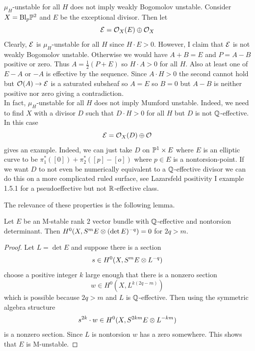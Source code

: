 \documentclass[main.tex]{subfiles}
\begin{document}
\begin{example}
$\mu_H$-unstable for all $H$ does not imply weakly Bogomolov unstable. Consider $X = \Bl_p \P^2$ and $E$ be the exceptional divisor. Then let
\[ \E = \struct{X}(E) \oplus \struct{X} \]
Clearly, $\E$ is $\mu_H$-unstable for all $H$ since $H \cdot E > 0$. However, I claim that $\E$ is not weakly Bogomolov unstable. Otherwise we would have $A + B = E$ and $P = A - B$ positive or zero. Thus $A = \tfrac{1}{2}(P + E)$ so $H \cdot A > 0$ for all $H$. Also at least one of $E - A$ or $-A$ is effective by the sequence. Since $A \cdot H > 0$ the second cannot hold but $\struct{}(A) \to \E$ is a saturated subsheaf so $A = E$ so $B = 0$ but $A - B$ is neither positive nor zero giving a contradiction.
\bigskip\\
In fact, $\mu_H$-unstable for all $H$ does not imply Mumford unstable. Indeed, we need to find $X$ with a divisor $D$ such that $D \cdot H > 0$ for all $H$ but $D$ is not $\Q$-effective. In this case
\[ \E = \struct{X}(D) \oplus \struct{} \]
gives an example. Indeed, we can just take $D$ on $\P^1 \times E$ where $E$ is an elliptic curve to be $\pi_1^* ([0]) + \pi_2^* ([p] - [o])$ where $p \in E$ is a nontorsion-point. If we want $D$ to not even be numerically equivalent to a $\Q$-effective divisor we can do this on a more complicated ruled surface, see Lazarsfeld positivity I example 1.5.1 for a pseudoeffective but not $\R$-effective class.
\end{example}


The relevance of these properties is the following lemma.

\begin{lemma}
Let $E$ be an M-stable rank $2$ vector bundle with $\Q$-effective and nontorsion determinant. Then $H^0(X, S^m E \ot (\det{E})^{-q}) = 0$ for $2 q > m$.
\end{lemma}

\begin{proof}
Let $L = \det{E}$ and suppose there is a section
\[ s \in H^0(X, S^m E \ot L^{-q}) \]
choose a positive integer $k$ large enough that there is a nonzero section
\[ w \in H^0(X, L^{k(2q - m)}) \]
which is possible because $2q > m$ and $L$ is $\Q$-effective. Then using the symmetric algebra structure
\[ s^{2k} \cdot w \in H^0(X, S^{2km} E \ot L^{-km}) \]
is a nonzero section. Since $L$ is nontorsion $w$ has a zero somewhere. This shows that $E$ is M-unstable.
\end{proof}
\end{document}
